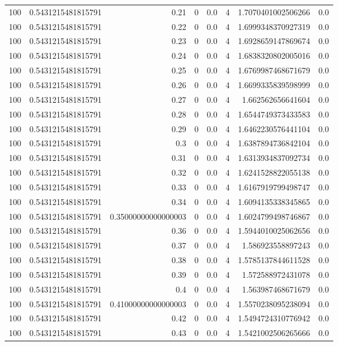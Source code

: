 \documentclass[11pt]{article}
\begin{document}
\begin{center}
\begin{tabular}{rrrrrrrr}
100 & 0.5431215481815791 & 0.21 & 0 & 0.0 & 4 & 1.7070401002506266 & 0.0\\
100 & 0.5431215481815791 & 0.22 & 0 & 0.0 & 4 & 1.6999348370927319 & 0.0\\
100 & 0.5431215481815791 & 0.23 & 0 & 0.0 & 4 & 1.6928659147869674 & 0.0\\
100 & 0.5431215481815791 & 0.24 & 0 & 0.0 & 4 & 1.6838320802005016 & 0.0\\
100 & 0.5431215481815791 & 0.25 & 0 & 0.0 & 4 & 1.6769987468671679 & 0.0\\
100 & 0.5431215481815791 & 0.26 & 0 & 0.0 & 4 & 1.6699335839598999 & 0.0\\
100 & 0.5431215481815791 & 0.27 & 0 & 0.0 & 4 & 1.662562656641604 & 0.0\\
100 & 0.5431215481815791 & 0.28 & 0 & 0.0 & 4 & 1.6544749373433583 & 0.0\\
100 & 0.5431215481815791 & 0.29 & 0 & 0.0 & 4 & 1.6462230576441104 & 0.0\\
100 & 0.5431215481815791 & 0.3 & 0 & 0.0 & 4 & 1.6387894736842104 & 0.0\\
100 & 0.5431215481815791 & 0.31 & 0 & 0.0 & 4 & 1.6313934837092734 & 0.0\\
100 & 0.5431215481815791 & 0.32 & 0 & 0.0 & 4 & 1.6241528822055138 & 0.0\\
100 & 0.5431215481815791 & 0.33 & 0 & 0.0 & 4 & 1.6167919799498747 & 0.0\\
100 & 0.5431215481815791 & 0.34 & 0 & 0.0 & 4 & 1.6094135338345865 & 0.0\\
100 & 0.5431215481815791 & 0.35000000000000003 & 0 & 0.0 & 4 & 1.6024799498746867 & 0.0\\
100 & 0.5431215481815791 & 0.36 & 0 & 0.0 & 4 & 1.5944010025062656 & 0.0\\
100 & 0.5431215481815791 & 0.37 & 0 & 0.0 & 4 & 1.586923558897243 & 0.0\\
100 & 0.5431215481815791 & 0.38 & 0 & 0.0 & 4 & 1.5785137844611528 & 0.0\\
100 & 0.5431215481815791 & 0.39 & 0 & 0.0 & 4 & 1.572588972431078 & 0.0\\
100 & 0.5431215481815791 & 0.4 & 0 & 0.0 & 4 & 1.563987468671679 & 0.0\\
100 & 0.5431215481815791 & 0.41000000000000003 & 0 & 0.0 & 4 & 1.5570238095238094 & 0.0\\
100 & 0.5431215481815791 & 0.42 & 0 & 0.0 & 4 & 1.5494724310776942 & 0.0\\
100 & 0.5431215481815791 & 0.43 & 0 & 0.0 & 4 & 1.5421002506265666 & 0.0\\

\end{tabular}
\end{center}
\end{document}
